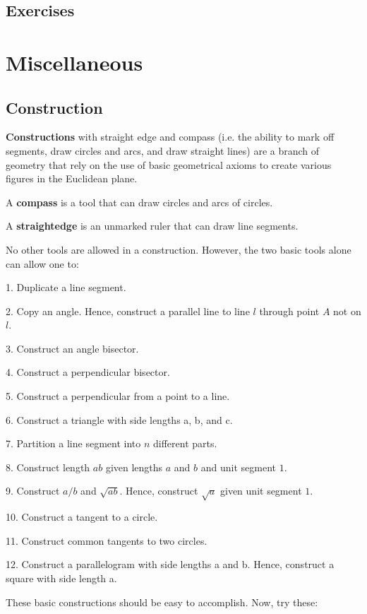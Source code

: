 \section*{Exercises}

\pagebreak

\chapter{Miscellaneous}
\section{Construction}
\textbf{Constructions} with straight edge and compass (i.e. the ability to mark off segments, draw circles and arcs, and draw straight lines) are a branch of geometry that rely on the use of basic geometrical axioms to create various figures in the Euclidean plane.

A \textbf{compass} is a tool that can draw circles and arcs of circles.

A \textbf{straightedge} is an unmarked ruler that can draw line segments.

No other tools are allowed in a construction. However, the two basic tools alone can allow one to:

1. Duplicate a line segment.

2. Copy an angle. Hence, construct a parallel line to line $l$ through point $A$ not on $l$.

3. Construct an angle bisector.

4. Construct a perpendicular bisector.

5. Construct a perpendicular from a point to a line.

6. Construct a triangle with side lengths a, b, and c.

7. Partition a line segment into $n$ different parts.

8. Construct length $ab$ given lengths $a$ and $b$ and unit segment $1$.

9. Construct $a/b$ and $\sqrt{ab}$. Hence, construct $\sqrt{a}$ given unit segment $1$.

10. Construct a tangent to a circle.

11. Construct common tangents to two circles.

12. Construct a parallelogram with side lengths a and b. Hence, construct a square with side length a.


These basic constructions should be easy to accomplish. Now, try these:

